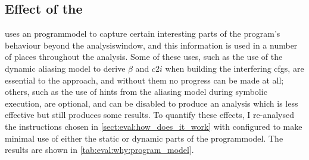 \subsection{Effect of the }

{\Technique} uses an \gls{programmodel} to capture certain interesting
parts of the program's behaviour beyond the \gls{analysiswindow}, and
this information is used in a number of places throughout the
analysis.  Some of these uses, such as the use of the dynamic aliasing
model to derive $\beta$ and $c2i$ when building the interfering
\glspl{cfg}, are essential to the approach, and without them no
progress can be made at all; others, such as the use of hints from the
aliasing model during symbolic execution, are optional, and can be
disabled to produce an analysis which is less effective but still
produces some results.  To quantify these effects, I re-analysed the
instructions chosen in \autoref{sect:eval:how_does_it_work} with
{\implementation} configured to make minimal use of either the static
or dynamic parts of the \gls{programmodel}.  The results are shown in
\autoref{tab:eval:why:program_model}.


